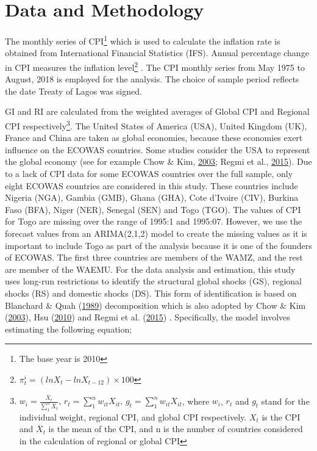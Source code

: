 \documentclass[]{article}
\let\rmarkdownfootnote\footnote%
\def\footnote{\protect\rmarkdownfootnote}
\begin{document}
\hypertarget{data-and-methodology}{%
\section{Data and Methodology}\label{data-and-methodology}}

The monthly series of  \ac{CPI}\footnote{The base year is 2010} which is used to calculate the inflation rate is obtained from International Financial Statistics (IFS). Annual percentage change in CPI measures the inflation level\footnote{\(\pi_t^i=(lnX_t-lnX_{t-12}) \times 100\)} . The CPI monthly series from May 1975 to August, 2018 is employed for the analysis. The choice of sample period reflects the date Treaty of Lagos was signed.

\ac{GI} and  \ac{RI} are calculated from the weighted averages of Global CPI and Regional CPI respectively\footnote{\(w_{i}=\frac{\overline{X}_t}{\sum_{1}^{n}\overline{X}_t} \text{, } r_t=\sum_1^nw_{it}X_{it}\text{, } g_t=\sum_1^nw_{it}X_{it}\), where \(w_i\), \(r_t\) and \(g_t\) stand for the individual weight, regional CPI, and global CPI respectively. \(X_t\) is the CPI and \(\overline{X}_t\) is the mean of the CPI, and n is the number of countries considered in the calculation of regional or global CPI}. The United States of America (USA), United Kingdom (UK), France and China are taken as global economies, because these economies exert influence on the ECOWAS countries. Some studies consider the USA to represent the global economy (see for example Chow \& Kim, \protect\hyperlink{ref-Chow2003}{2003}; Regmi et al., \protect\hyperlink{ref-Regmi2015}{2015}). Due to a lack of CPI data for some ECOWAS countries over the full sample, only eight ECOWAS countries are considered in this study. These countries include Nigeria (NGA), Gambia (GMB), Ghana (GHA), Cote d'Ivoire (CIV), Burkina Faso (BFA), Niger (NER), Senegal (SEN) and Togo (TGO). The values of CPI for Togo are missing over the range of 1995:1 and 1995:07. However, we use the forecast values from an ARIMA(2,1,2) model to create the missing values as it is important to include Togo as part of the analysis because it is one of the founders of ECOWAS. The first three countries are members of the WAMZ, and the rest are member of the WAEMU.
For the data analysis and estimation, this study uses long-run restrictions to identify the structural global shocks (GS), regional shocks (RS) and domestic shocks (DS). This form of identification is based on Blanchard \& Quah (\protect\hyperlink{ref-Blanchard1989}{1989}) decomposition which is also adopted by Chow \& Kim (\protect\hyperlink{ref-Chow2003}{2003}), Hsu (\protect\hyperlink{ref-hsu2010common}{2010}) and Regmi et al. (\protect\hyperlink{ref-Regmi2015}{2015}) . Specifically, the model involves estimating the following equation;
\end{document}
